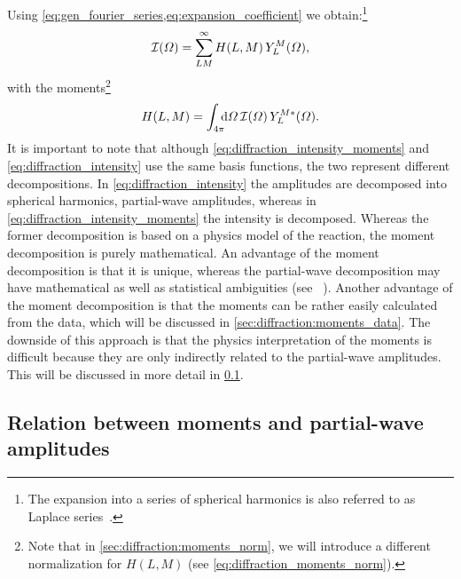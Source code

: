 Using \cref{eq:gen_fourier_series,eq:expansion_coefficient} we
obtain:\footnote{The expansion into a series of spherical harmonics is
also referred to as Laplace series~\cite{MathWorld:LaplaceSeries}.}
\begin{equation}
  \label{eq:diffraction_intensity_moments}
  \mathcal{I}(\Omega)
  = \sum_{L M}^\infty H(L, M)\, Y_L^M(\Omega),
\end{equation}
with the moments\footnote{Note that in
\cref{sec:diffraction:moments_norm}, we will introduce a different
normalization for $H(L, M)$ (see \cref{eq:diffraction_moments_norm}).}
\begin{equation}
  \label{eq:diffraction_moments}
  H(L, M)
  = \int_{4 \pi}\!\!\! \dif{\Omega}\, \intensity(\Omega)\, Y_L^{M *}(\Omega).
\end{equation}
It is important to note that although
\cref{eq:diffraction_intensity_moments} and
\cref{eq:diffraction_intensity} use the same basis functions, the two
represent different decompositions.  In
\cref{eq:diffraction_intensity} the amplitudes are decomposed into
spherical harmonics, \ie partial-wave amplitudes, whereas in
\cref{eq:diffraction_intensity_moments} the intensity is decomposed.
Whereas the former decomposition is based on a physics model of the
reaction, the moment decomposition is purely mathematical.  An
advantage of the moment decomposition is that it is unique, whereas
the partial-wave decomposition may have mathematical as well as
statistical ambiguities (see \eg\ ).  Another
advantage of the moment decomposition is that the moments can be
rather easily calculated from the data, which will be discussed in
\cref{sec:diffraction:moments_data}.  The downside of this approach is
that the physics interpretation of the moments is difficult because
they are only indirectly related to the partial-wave amplitudes.  This
will be discussed in more detail in \cref{sec:diffraction:moments_pw}.


\subsection{Relation between moments and partial-wave amplitudes}%
\label{sec:diffraction:moments_pw}

